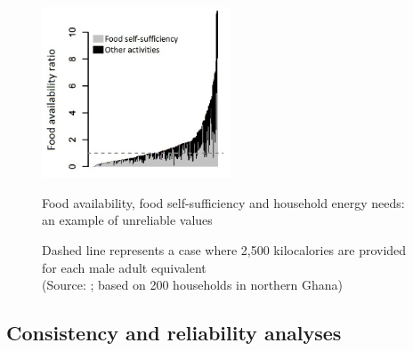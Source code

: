 \begin{figure}
  \includegraphics[width=0.5\textwidth]{figs_03/image1.png}
  \captionsetup{singlelinecheck = off, justification=justified} %
  \caption{Food availability, food self-sufficiency and household energy needs: an example of unreliable values}
  \small
  \vspace*{-3mm}
  \caption*{Dashed line represents a case where 2,500 kilocalories are provided for each male adult equivalent \\
    (Source: \citealp{Rosenstock2017}; based on 200 households in northern Ghana)}
  \label{fig:03_1}
\end{figure}






\subsection{Consistency and reliability analyses}

